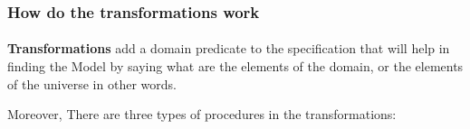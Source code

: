 		

	 \subsubsection{How do the transformations work}
	 
		\paragraph{} 
		\textbf{Transformations} add a domain predicate to the specification that will help in finding the Model by saying what are the elements of the domain, or the elements of the universe in other words.\par
		Moreover, There are three types of procedures in the transformations:	
